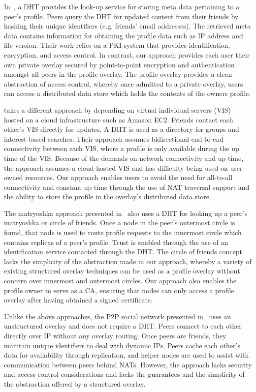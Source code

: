 \documentclass[letterpaper,twocolumn,10pt]{article}
\begin{document}
In~\cite{peerson}, a DHT provides the look-up service for storing meta data
pertaining to a peer's profile. Peers query the DHT for updated content from 
their friends by hashing their unique identifiers (e.g. friends' email
addresses).  The retrieved meta data contains information for obtaining the
profile data such as IP address and file version. Their work relies
on a PKI system that provides identification, encryption, and access control.
In contrast, our approach provides each user their own private overlay secured
by point-to-point encryption and authentication amongst all peers in the profile
overlay.  The profile overlay provides a clean abstraction of access control,
whereby once admitted to a private overlay, users can access a distributed data
store which holds the contents of the owners profile.

\cite{vis-a-vis} takes a different approach by depending on virtual individual
servers (VIS) hosted on a cloud infrastructure such as Amazon EC2. Friends
contact each other's VIS directly for updates.  A DHT is used as a directory for
groups and interest-based searches. Their approach assumes bidirectional
end-to-end connectivity between each VIS, where a profile is only available
during the up time of the VIS.  Because of the demands on network connectivity
and up time, the approach assumes a cloud-hosted VIS and has difficulty being used on user-owned resources.
Our approach enables users to avoid the need for all-to-all connectivity and
constant up time through the use of NAT traversal support and the
ability to store the profile in the overlay's distributed data store.

The matryoshka approach presented in~\cite{matryoshka} also uses a DHT for
looking up a peer's matryoshka or circle of friends. Once a node in the peer's
outermost circle is found, that node is used to route profile requests to the
innermost circle which contains replicas of a peer's profile. Trust is enabled
through the use of an identification service contacted through the DHT.  The
circle of friends concept lacks the simplicity of the abstraction made in our
approach, whereby a variety of existing structured overlay techniques can be used as a profile
overlay without concern over innermost and outermost circles.  Our approach
also enables the profile owner to serve as a CA, ensuring that nodes can only
access a profile overlay after having obtained a signed certificate.

Unlike the above approaches, the P2P social network presented in~\cite{tribler-osn}
uses an unstructured overlay and does not require a DHT.  Peers
connect to each other directly over IP without any overlay routing. Once peers
are friends, they maintain unique identifiers to deal with dynamic IPs.  Peers
cache each other's data for availability through replication, and helper nodes
are used to assist with communication between peers behind NATs.  However, the
approach lacks security and access control considerations and lacks the
guarantees and the simplicity of the abstraction offered by a structured overlay.
\end{document}
